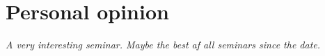 \section{Personal opinion}

\textit{A very interesting seminar. Maybe the best af all seminars since the date.}